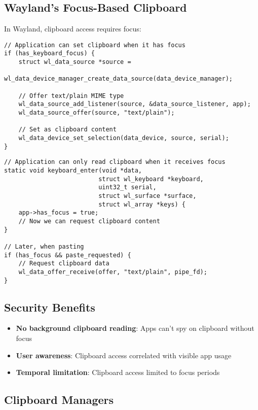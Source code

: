 \subsection{Wayland's Focus-Based Clipboard}

In Wayland, clipboard access requires focus:

\begin{lstlisting}[style=cstyle, caption=Setting Clipboard Content]
// Application can set clipboard when it has focus
if (has_keyboard_focus) {
    struct wl_data_source *source =
        wl_data_device_manager_create_data_source(data_device_manager);

    // Offer text/plain MIME type
    wl_data_source_add_listener(source, &data_source_listener, app);
    wl_data_source_offer(source, "text/plain");

    // Set as clipboard content
    wl_data_device_set_selection(data_device, source, serial);
}
\end{lstlisting}

\begin{lstlisting}[style=cstyle, caption=Reading Clipboard Content]
// Application can only read clipboard when it receives focus
static void keyboard_enter(void *data,
                          struct wl_keyboard *keyboard,
                          uint32_t serial,
                          struct wl_surface *surface,
                          struct wl_array *keys) {
    app->has_focus = true;
    // Now we can request clipboard content
}

// Later, when pasting
if (has_focus && paste_requested) {
    // Request clipboard data
    wl_data_offer_receive(offer, "text/plain", pipe_fd);
}
\end{lstlisting}

\subsection{Security Benefits}

\begin{itemize}
    \item \textbf{No background clipboard reading}: Apps can't spy on clipboard without focus
    \item \textbf{User awareness}: Clipboard access correlated with visible app usage
    \item \textbf{Temporal limitation}: Clipboard access limited to focus periods
\end{itemize}

\subsection{Clipboard Managers}

